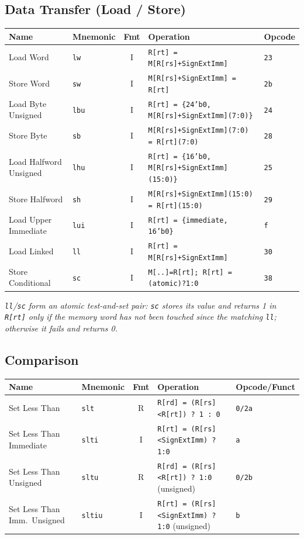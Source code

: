 \documentclass[10pt]{article}
\newcommand{\op}[1]{\texttt{#1}}
\begin{document}
\subsection{Data Transfer (Load / Store)}
\begin{center}
\small
\begin{tabular}{@{}p{2.9cm}p{1.6cm}cp{6.3cm}l@{}}
\toprule
Name & Mnemonic & Fmt & Operation & Opcode \\
\midrule
Load Word           & \op{lw}  & I & \op{R[rt] = M[R[rs]+SignExtImm]} & \op{23} \\
Store Word          & \op{sw}  & I & \op{M[R[rs]+SignExtImm] = R[rt]} & \op{2b} \\
Load Byte Unsigned  & \op{lbu} & I & \op{R[rt] = \{24'b0, M[R[rs]+SignExtImm](7:0)\}} & \op{24} \\
Store Byte          & \op{sb}  & I & \op{M[R[rs]+SignExtImm](7:0) = R[rt](7:0)} & \op{28} \\
Load Halfword Unsigned & \op{lhu} & I & \op{R[rt] = \{16'b0, M[R[rs]+SignExtImm](15:0)\}} & \op{25} \\
Store Halfword      & \op{sh}  & I & \op{M[R[rs]+SignExtImm](15:0) = R[rt](15:0)} & \op{29} \\
Load Upper Immediate& \op{lui} & I & \op{R[rt] = \{immediate, 16'b0\}} & \op{f} \\
Load Linked         & \op{ll}  & I & \op{R[rt] = M[R[rs]+SignExtImm]} & \op{30} \\
Store Conditional   & \op{sc}  & I & \op{M[..]=R[rt]; R[rt] = (atomic)?1:0} & \op{38} \\
\bottomrule
\end{tabular}
\end{center}
\emph{\op{ll}/\op{sc} form an atomic test-and-set pair: \op{sc} stores its
value and returns 1 in \op{R[rt]} only if the memory word has not been
touched since the matching \op{ll}; otherwise it fails and returns 0.}

\subsection{Comparison}
\begin{center}
\small
\begin{tabular}{@{}p{3.1cm}p{1.6cm}cp{6.1cm}l@{}}
\toprule
Name & Mnemonic & Fmt & Operation & Opcode/Funct \\
\midrule
Set Less Than             & \op{slt}   & R & \op{R[rd] = (R[rs]\textless R[rt]) ? 1 : 0} & \op{0/2a} \\
Set Less Than Immediate   & \op{slti}  & I & \op{R[rt] = (R[rs]\textless SignExtImm) ? 1:0} & \op{a} \\
Set Less Than Unsigned    & \op{sltu}  & R & \op{R[rd] = (R[rs]\textless R[rt]) ? 1:0} (unsigned) & \op{0/2b} \\
Set Less Than Imm.\ Unsigned & \op{sltiu} & I & \op{R[rt] = (R[rs]\textless SignExtImm) ? 1:0} (unsigned) & \op{b} \\
\bottomrule
\end{tabular}
\end{center}
\end{document}
